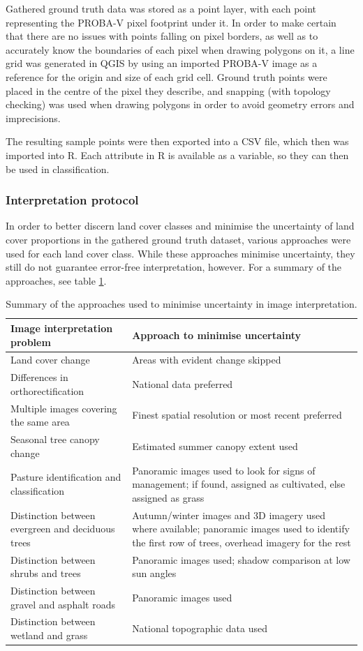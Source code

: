 \documentclass[a4paper,12pt]{scrbook}
\begin{document}
Gathered ground truth data was stored as a point layer, with each point representing the PROBA-V pixel footprint under it. In order to make certain that there are no issues with points falling on pixel borders, as well as to accurately know the boundaries of each pixel when drawing polygons on it, a line grid was generated in QGIS by using an imported PROBA-V image as a reference for the origin and size of each grid cell. Ground truth points were placed in the centre of the pixel they describe, and snapping (with topology checking) was used when drawing polygons in order to avoid geometry errors and imprecisions.

The resulting sample points were then exported into a CSV file, which then was imported into R. Each attribute in R is available as a variable, so they can then be used in classification.

\subsubsection{Interpretation protocol}

In order to better discern land cover classes and minimise the uncertainty of land cover proportions in the gathered ground truth dataset, various approaches were used for each land cover class. While these approaches minimise uncertainty, they still do not guarantee error-free interpretation, however. For a summary of the approaches, see table \ref{tbl-protocol}.

\begin{table}
  \centering
  \begin{tabular}{p{}p{}}
    Image interpretation problem & Approach to minimise uncertainty\\ \hline
    Land cover change & Areas with evident change skipped\\
    Differences in orthorectification & National data preferred\\
    Multiple images covering the same area & Finest spatial resolution or most recent preferred\\
    Seasonal tree canopy change & Estimated summer canopy extent used\\
    Pasture identification and classification & Panoramic images used to look for signs of management; if found, assigned as cultivated, else assigned as grass\\
    Distinction between evergreen and deciduous trees & Autumn/winter images and 3D imagery used where available; panoramic images used to identify the first row of trees, overhead imagery for the rest\\
    Distinction between shrubs and trees & Panoramic images used; shadow comparison at low sun angles\\
    Distinction between gravel and asphalt roads & Panoramic images used\\
    Distinction between wetland and grass & National topographic data used
  \end{tabular}
  \caption{Summary of the approaches used to minimise uncertainty in image interpretation.}
  \label{tbl-protocol}
\end{table}
\end{document}
